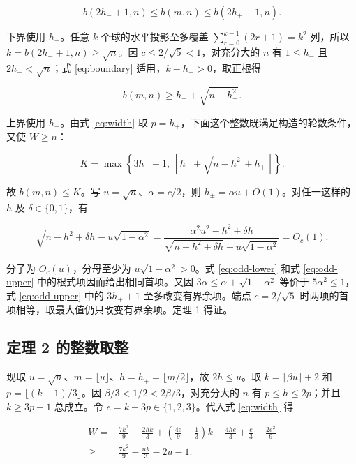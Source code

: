 \documentclass[UTF8,a4paper,11pt,fontset=fandol]{ctexart}
\begin{document}
\begin{equation}\label{eq:parity}
b(2h_-+1,n)\le b(m,n)\le b(2h_++1,n).
\end{equation}

下界使用 $h_-$。任意 $k$ 个球的水平投影至多覆盖 $\sum_{r=0}^{k-1}(2r+1)=k^2$ 列，所以 $k=b(2h_-+1,n)\ge\sqrt{n}$。因 $c\le2/\sqrt{5}<1$，对充分大的 $n$ 有 $1\le h_-$ 且 $2h_-<\sqrt{n}$；式 \eqref{eq:boundary} 适用，$k-h_->0$，取正根得

\begin{equation}\label{eq:odd-lower}
b(m,n)\ge h_-+\sqrt{n-h_-^2}.
\end{equation}

上界使用 $h_+$。由式 \eqref{eq:width} 取 $p=h_+$，下面这个整数既满足构造的轮数条件，又使 $W\ge n$：

\begin{equation}\label{eq:odd-upper}
K=\max\left\{3h_++1,\
  \left\lceil h_++\sqrt{n-h_+^2+h_+}\right\rceil\right\}.
\end{equation}

故 $b(m,n)\le K$。写 $u=\sqrt{n}$、$\alpha=c/2$，则 $h_\pm=\alpha u+O(1)$。对任一这样的 $h$ 及 $\delta\in\{0,1\}$，有

\[
\sqrt{n-h^2+\delta h}-u\sqrt{1-\alpha^2}
=\frac{\alpha^2u^2-h^2+\delta h}
       {\sqrt{n-h^2+\delta h}+u\sqrt{1-\alpha^2}}
=O_c(1).
\]

分子为 $O_c(u)$，分母至少为 $u\sqrt{1-\alpha^2}>0$。式 \eqref{eq:odd-lower} 和式 \eqref{eq:odd-upper} 中的根式项因而给出相同首项。又因 $3\alpha\le\alpha+\sqrt{1-\alpha^2}$ 等价于 $5\alpha^2\le1$，式 \eqref{eq:odd-upper} 中的 $3h_++1$ 至多改变有界余项。端点 $c=2/\sqrt{5}$ 时两项的首项相等，取最大值仍只改变有界余项。定理 1 得证。

\subsection{定理 2 的整数取整}

现取 $u=\sqrt{n}$、$m=\lfloor u\rfloor$、$h=h_+=\lfloor m/2\rfloor$，故 $2h\le u$。取 $k=\lceil\beta u\rceil+2$ 和 $p=\lfloor(k-1)/3\rfloor$。因 $\beta/3<1/2<2\beta/3$，对充分大的 $n$ 有 $p\le h\le2p$；并且 $k\ge3p+1$ 总成立。令 $e=k-3p\in\{1,2,3\}$。代入式 \eqref{eq:width} 得

\begin{equation}\label{eq:beta-width}
\begin{aligned}
W={}&\frac{7k^2}{9}-\frac{2hk}{3}
 +\left(\frac{4e}{9}-\frac13\right)k-\frac{4he}{3}
 +\frac e3-\frac{2e^2}{9}\\
\ge{}&\frac{7k^2}{9}-\frac{uk}{3}-2u-1.
\end{aligned}
\end{equation}
\end{document}
